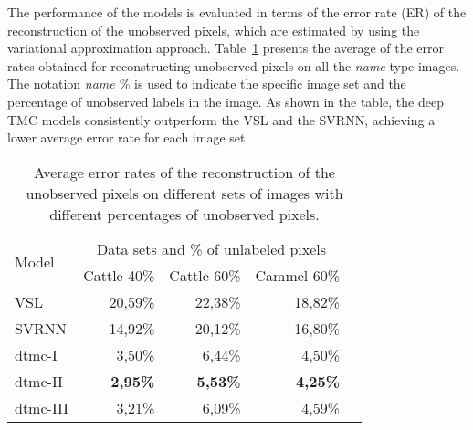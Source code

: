 The performance of the models is evaluated in terms of
the error rate (ER) of the reconstruction of the unobserved pixels, 
which are estimated by using the variational approximation approach.
Table~\ref{tab:error_rates} presents the average of the error rates 
obtained for reconstructing unobserved pixels on all the 
\textit{name}-type images. 
The notation \textit{name $\%$} is used to indicate the specific 
image set and the percentage of unobserved labels in the image. 
As shown in the table, the deep TMC models consistently outperform 
the VSL and the SVRNN, achieving a lower average error rate for each image set. 

% 
\vspace{-0.1cm}

\begin{table}[!htpb]
    \begin{center}
    \begin{tabular}{|l|r|r|r|r|}
    \hline
    \multirow{2}{*}{Model}  &\multicolumn{3}{c|}{Data sets and \% of unlabeled pixels}\\ 
    \cline{2-4} 
      & \multicolumn{1}{c|}{Cattle 40\%} & \multicolumn{1}{c|}{Cattle 60\%} & \multicolumn{1}{c|}{Cammel 60\%} \\ 
      \hline \hline
      \multicolumn{1}{|l|}{VSL}      & 20,59\% & 22,38\% & 18,82\% \\ \hline
      \multicolumn{1}{|l|}{SVRNN}    & 14,92\% & 20,12\% & 16,80\% \\ \hline
      \multicolumn{1}{|l|}{\gls*{dtmc}-I}   & 3,50\%  & 6,44\%  & 4,50\%  \\ \hline
      \multicolumn{1}{|l|}{\gls*{dtmc}-II} & \textbf{2,95\%}                  & \textbf{5,53\%}                  & \textbf{4,25\%}                 \\ \hline
      \multicolumn{1}{|l|}{\gls*{dtmc}-III} & 3,21\%  & 6,09\%  & 4,59\%  \\ \hline
      \end{tabular}
      \vspace{-0.2cm}
      \caption{Average error rates of the
       reconstruction of the unobserved pixels on different 
       sets of images with different percentages of unobserved pixels.}      
    \label{tab:error_rates}
    \end{center}
\end{table}


